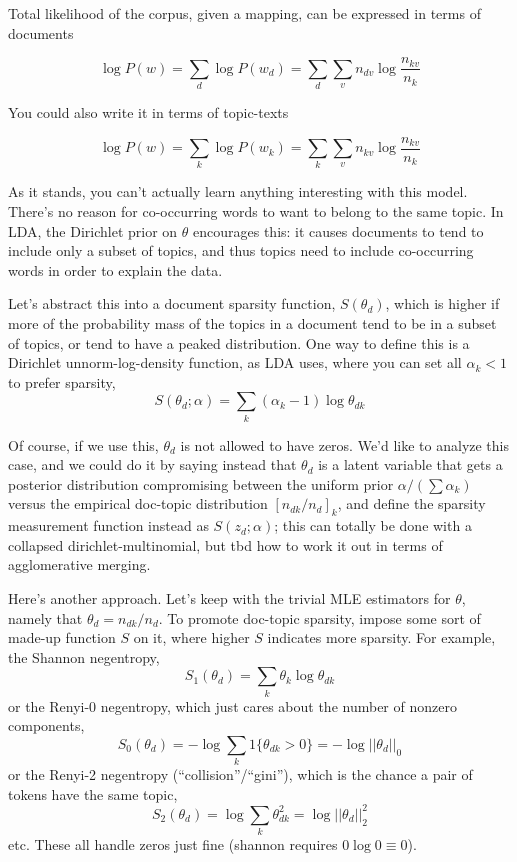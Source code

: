 \documentclass[11pt,letterpaper]{article}
\theoremstyle{definition}
\begin{document}
Total likelihood of the corpus, given a mapping, can be expressed in terms of documents

\[ \log P(w) = \sum_d \log P(w_d) = \sum_d \sum_v n_{dv} \log \frac{n_{kv}}{n_k} \]

You could also write it in terms of topic-texts

\[ \log P(w) = \sum_k \log P(w_k) = \sum_k \sum_v n_{kv} \log \frac{n_{kv}}{n_k} \]

As it stands, you can't actually learn anything interesting with this model.  There's no reason for co-occurring words to want to belong to the same topic.
In LDA, the Dirichlet prior on $\theta$ encourages this: it causes documents to tend to include only a subset of topics, and thus topics need to include co-occurring words in order to explain the data.

Let's abstract this into a document sparsity function, $S(\theta_d)$, which is higher if more of the probability mass of the topics in a document tend to be in a subset of topics, or tend to have a peaked distribution.  One way to define this is a Dirichlet unnorm-log-density function, as LDA uses, where you can set all $\alpha_k<1$ to prefer sparsity,
\[ S(\theta_d; \alpha) = \sum_k \left(\alpha_k - 1\right) \log \theta_{dk} \]

Of course, if we use this, $\theta_d$ is not allowed to have zeros.  We'd like to analyze this case, and we could do it by saying instead that $\theta_d$ is a latent variable that gets a posterior distribution compromising between the uniform prior $\alpha/(\sum\alpha_k)$ versus the empirical doc-topic distribution $[n_{dk}/n_d]_k$, and define the sparsity measurement function instead as $S(z_d;\alpha)$; this can totally be done with a collapsed dirichlet-multinomial, but tbd how to work it out in terms of agglomerative merging.

Here's another approach.  Let's keep with the trivial MLE estimators for $\theta$, namely that $\theta_d=n_{dk}/n_d$.  To promote doc-topic sparsity, impose some sort of made-up function $S$ on it, where higher $S$ indicates more sparsity.  For example, the Shannon negentropy,
\[ S_1(\theta_d) = \sum_k \theta_k \log \theta_{dk} \]
or the Renyi-0 negentropy, which just cares about the number of nonzero components,
\[ S_0(\theta_d) = -\log \sum_k 1\{\theta_{dk}>0\} = -\log ||\theta_d||_0\]
or the Renyi-2 negentropy (``collision''/``gini''), which is the chance a pair of tokens have the same topic,
\[ S_2(\theta_d) = \log \sum_k \theta_{dk}^2 = \log ||\theta_d||^2_2 \]
etc.  These all handle zeros just fine (shannon requires $0\log 0\equiv 0$).
\end{document}
